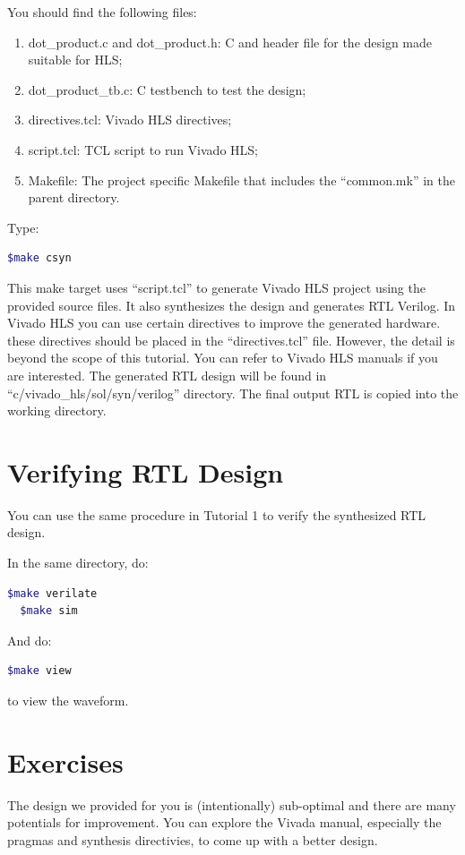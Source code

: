 \documentclass[12pt]{article}
\begin{document}
You should find the following files:

\begin{enumerate}
\item dot\_product.c and dot\_product.h: C and header file for the design
  made suitable for HLS;

\item dot\_product\_tb.c: C testbench to test the design;

\item directives.tcl: Vivado HLS directives;

\item script.tcl: TCL script to run Vivado HLS;

\item Makefile: The project specific Makefile that includes the “common.mk” in
  the parent directory.
  
\end{enumerate}

Type: 
\begin{lstlisting}[language=bash]
  $make csyn
\end{lstlisting}

This make target uses “script.tcl” to generate Vivado HLS project
using the provided source files. It also synthesizes the design and
generates RTL Verilog. In Vivado HLS you can use certain directives to
improve the generated hardware. these directives should be placed in
the “directives.tcl” file. However, the detail is beyond the scope of
this tutorial. You can refer to Vivado HLS manuals if you are
interested. The generated RTL design will be found in
“c/vivado\_hls/sol/syn/verilog” directory. The final output RTL is
copied into the working directory.

\section{Verifying RTL Design}

You can use the same procedure in Tutorial 1 to verify the
synthesized RTL design.

In the same directory, do: 

\begin{lstlisting}[language=bash]
  $make verilate
  $make sim
\end{lstlisting}

And do: 

\begin{lstlisting}[language=bash]
  $make view
\end{lstlisting}

to view the waveform.


\section{Exercises}

The design we provided for you is (intentionally) sub-optimal and
there are many potentials for improvement. You can explore the Vivada
manual, especially the pragmas and synthesis directivies, to come up
with a better design.
\end{document}
